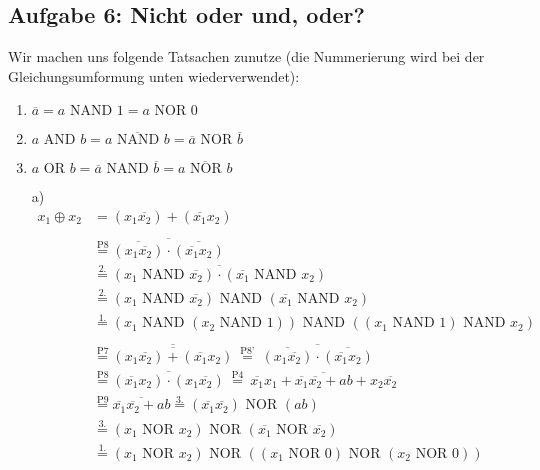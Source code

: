 \documentclass{article}
\def\orr{\text{ OR }}
\def\andd{\text{ AND }}
\def\nor{\text{ NOR }}
\def\nand{\text{ NAND }}
\newcommand{\nyet}{\overline}
\begin{document}
	\subsection*{Aufgabe 6: Nicht oder und, oder?}
	Wir machen uns folgende Tatsachen zunutze (die Nummerierung wird bei der Gleichungsumformung unten wiederverwendet):
	\begin{enumerate}
		\item $\nyet{a} = a \nand 1 = a \nor 0$
		\item $a \andd b = \nyet{a \nand b} = \nyet{a} \nor \nyet{b}$
		\item $a \orr b = \nyet{a} \nand \nyet{b} = \nyet{a \nor b}$
	\end{enumerate}
	\begin{enumerate}
		\item[a)]
		\begin{align*}
			x_1 \oplus x_2 &= (x_1 \nyet{x_2}) + (\nyet{x_1} x_2) \\\\
			&\stackrel{\text{P8}}{=} \nyet{\nyet{(x_1 \nyet{x_2})} \cdot \nyet{(\nyet{x_1} x_2)}}\\
			&\stackrel{\text{2.}}{=} \nyet{(x_1 \nand \nyet{x_2}) \cdot (\nyet{x_1} \nand x_2)} \\
			&\stackrel{\text{2.}}{=} (x_1 \nand \nyet{x_2}) \nand (\nyet{x_1} \nand x_2) \\
			&\stackrel{\text{1.}}{=} (x_1 \nand (x_2 \nand 1)) \nand ((x_1 \nand 1) \nand x_2) \\\\
			&\stackrel{\text{P7}}{=} \nyet{\nyet{(x_1 \nyet{x_2}) + (\nyet{x_1} x_2)}} \: \stackrel{\text{P8'}}{=} \: \nyet{\nyet{(x_1 \nyet{x_2})} \cdot \nyet{(\nyet{x_1} x_2)}} \\
			&\stackrel{\text{P8}}{=} \nyet{(\nyet{x_1} x_2) \cdot (x_1 \nyet{x_2})} \: \stackrel{\text{P4}}{=} \: \nyet{\nyet{x_1}x_1 + \nyet{x_1}\nyet{x_2} + ab + x_2\nyet{x_2}} \\
			&\stackrel{\text{P9}}{=} \nyet{\nyet{x_1}\nyet{x_2} + ab} \stackrel{\text{3.}}{=} (\nyet{x_1}\nyet{x_2}) \nor (ab) \\
			&\stackrel{\text{3.}}{=} (x_1 \nor x_2) \nor (\nyet{x_1} \nor \nyet{x_2}) \\
			&\stackrel{\text{1.}}{=} (x_1 \nor x_2) \nor ((x_1 \nor 0) \nor (x_2 \nor 0))
		\end{align*}

\end{enumerate}
\end{document}
